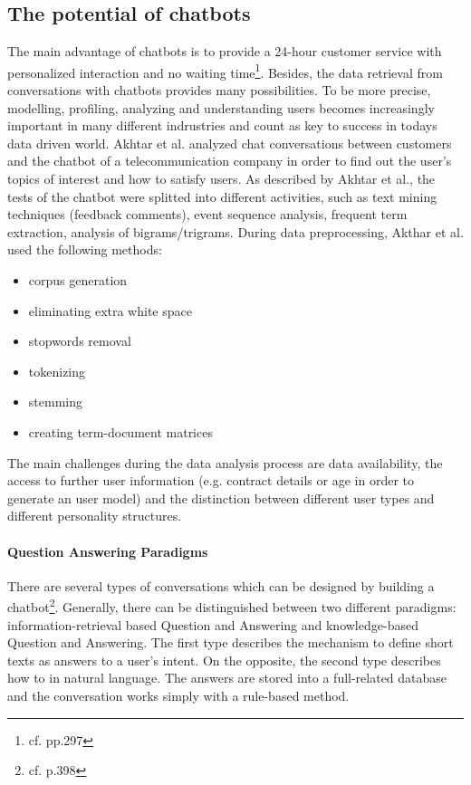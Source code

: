 \subsection{The potential of chatbots}
The main advantage of chatbots is to provide a 24-hour customer service with personalized interaction and no waiting time\footnote{cf.\autocite{akhtar} pp.297}. 
Besides, the data retrieval from conversations with chatbots provides many possibilities. To be more precise,  modelling, profiling, analyzing and understanding users becomes increasingly important in many different indrustries and count as key to success in todays data driven world. 
Akhtar et al. analyzed chat conversations between customers and the chatbot of a telecommunication company in order to find out the user's topics of interest and how to satisfy users. As described by Akhtar et al., the tests of the chatbot were splitted into different activities, such as text mining techniques (feedback comments), event sequence analysis, frequent term extraction, analysis of bigrams/trigrams. 
During data preprocessing, Akthar et al. used the following methods:
\begin{itemize}
\setlength\itemsep{-0.5em}
  \item[1.] corpus generation
  \item[2.] eliminating extra white space
  \item[3.] stopwords removal
  \item[4.] tokenizing
  \item[5.] stemming
  \item[6.] creating term-document matrices
\end{itemize}

The main challenges during the data analysis process are data availability, the access to further user information (e.g. contract details or age in order to generate an user model) and the distinction between different user types and different personality structures.

\paragraph{Question Answering Paradigms}
There are several types of conversations which can be designed by building a chatbot\footnote{cf.\autocite{akhtar} p.398}. Generally, there can be distinguished between two different paradigms: information-retrieval based Question and Answering and knowledge-based Question and Answering. The first type describes the mechanism to define short texts as answers to a user's intent. On the opposite, the second type describes how to in natural language. The answers are stored into a full-related database and the conversation works simply with a rule-based method.
